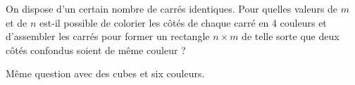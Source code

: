 On dispose d'un certain nombre de carrés identiques. Pour quelles valeurs de $m$ et de $n$ est-il possible de colorier les côtés de chaque carré en $4$ couleurs et d'assembler les carrés pour former un rectangle $n \times m$ de telle sorte que deux côtés confondus soient de même couleur ?

Même question avec des cubes et six couleurs.
